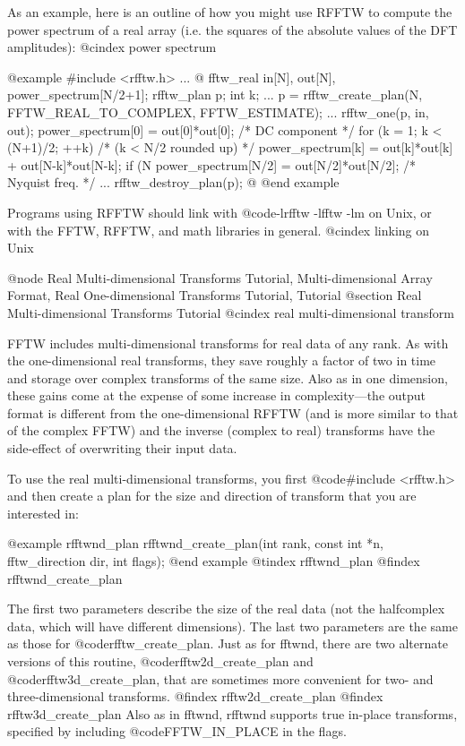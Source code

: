 As an example, here is an outline of how you might use RFFTW to compute
the power spectrum of a real array (i.e. the squares of the absolute
values of the DFT amplitudes):
@cindex power spectrum

@example
#include <rfftw.h>
...
@{
     fftw_real in[N], out[N], power_spectrum[N/2+1];
     rfftw_plan p;
     int k;
     ...
     p = rfftw_create_plan(N, FFTW_REAL_TO_COMPLEX, FFTW_ESTIMATE);
     ...
     rfftw_one(p, in, out);
     power_spectrum[0] = out[0]*out[0];  /* DC component */
     for (k = 1; k < (N+1)/2; ++k)  /* (k < N/2 rounded up) */
          power_spectrum[k] = out[k]*out[k] + out[N-k]*out[N-k];
     if (N %
          power_spectrum[N/2] = out[N/2]*out[N/2];  /* Nyquist freq. */
     ...
     rfftw_destroy_plan(p);
@}
@end example

Programs using RFFTW should link with @code{-lrfftw -lfftw -lm} on Unix,
or with the FFTW, RFFTW, and math libraries in general.
@cindex linking on Unix

@node Real Multi-dimensional Transforms Tutorial, Multi-dimensional Array Format, Real One-dimensional Transforms Tutorial, Tutorial
@section Real Multi-dimensional Transforms Tutorial
@cindex real multi-dimensional transform

FFTW includes multi-dimensional transforms for real data of any rank.
As with the one-dimensional real transforms, they save roughly a factor
of two in time and storage over complex transforms of the same size.
Also as in one dimension, these gains come at the expense of some
increase in complexity---the output format is different from the
one-dimensional RFFTW (and is more similar to that of the complex FFTW)
and the inverse (complex to real) transforms have the side-effect of
overwriting their input data.  

To use the real multi-dimensional transforms, you first @code{#include
<rfftw.h>} and then create a plan for the size and direction of
transform that you are interested in:

@example
rfftwnd_plan rfftwnd_create_plan(int rank, const int *n,
                                 fftw_direction dir, int flags);
@end example
@tindex rfftwnd_plan
@findex rfftwnd_create_plan

The first two parameters describe the size of the real data (not the
halfcomplex data, which will have different dimensions).  The last two
parameters are the same as those for @code{rfftw_create_plan}.  Just as
for fftwnd, there are two alternate versions of this routine,
@code{rfftw2d_create_plan} and @code{rfftw3d_create_plan}, that are
sometimes more convenient for two- and three-dimensional transforms.
@findex rfftw2d_create_plan
@findex rfftw3d_create_plan
Also as in fftwnd, rfftwnd supports true in-place transforms, specified
by including @code{FFTW_IN_PLACE} in the flags.

